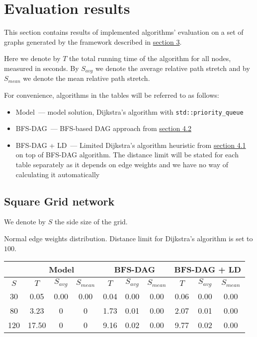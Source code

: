 \section{Evaluation results}

This section contains results of implemented algorithms' evaluation on a set of graphs generated by the framework described in \hyperref[sec:testing]{section 3}.

Here we denote by $T$ the total running time of the algorithm for all nodes, measured in seconds. By $S_{avg}$ we denote the average relative path stretch and by $S_{mean}$ we denote the mean relative path stretch.

For convenience, algorithms in the tables will be referred to as follows:
\begin{itemize}
\item Model~--- model solution, Dijkstra's algorithm with \texttt{std::priority\_queue}
\item BFS-DAG~--- BFS-based DAG approach from \hyperref[sec:bfs-dag]{section 4.2}
\item BFS-DAG + LD~--- Limited Dijkstra's algorithm heuristic from \hyperref[sec:ld]{section 4.1} on top of BFS-DAG algorithm. The distance limit will be stated for each table separately as it depends on edge weights and we have no way of calculating it automatically
\end{itemize}

\subsection{Square Grid network}

We denote by $S$ the side size of the grid.

Normal edge weights distribution. Distance limit for Dijkstra's algorithm is set to $100$.

\smallskip

\bgroup
\def\arraystretch{1.5}
\begin{tabular}{ |c|c|c|c|c|c|c|c|c|c| } 

\hline
& \multicolumn{3}{|c|}{Model}
& \multicolumn{3}{|c|}{BFS-DAG}
& \multicolumn{3}{|c|}{BFS-DAG + LD} \\

\hline
$S$
& $T$ & $S_{avg}$ & $S_{mean}$
& $T$ & $S_{avg}$ & $S_{mean}$
& $T$ & $S_{avg}$ & $S_{mean}$ \\

\hline
30
& 0.05 & 0.00 & 0.00
& 0.04 & 0.00 & 0.00
& 0.06 & 0.00 & 0.00 \\

\hline
80
& 3.23 & 0 & 0
& 1.73 & 0.01 & 0.00
& 2.07 & 0.01 & 0.00 \\

\hline
120
& 17.50 & 0 & 0
& 9.16 & 0.02 & 0.00
& 9.77 & 0.02 & 0.00 \\

\hline
\end{tabular}
\egroup

